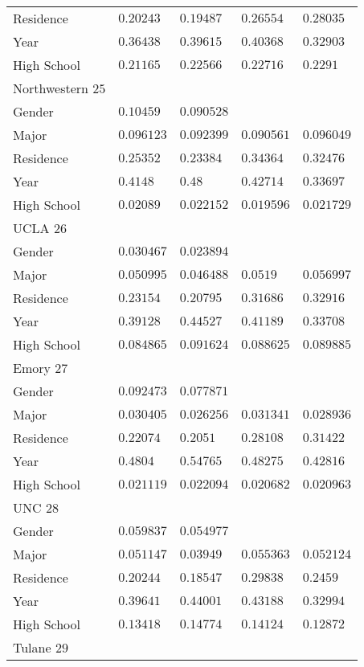 \begin{center}
\begin{longtable}{|l|l|l|l|l|}
Residence & $0.20243$ & $0.19487$ & $0.26554$ & $0.28035$ \\
Year & $0.36438$ & $0.39615$ & $0.40368$ & $0.32903$ \\
High School & $0.21165$ & $0.22566$ & $0.22716$ & $0.2291$ \\ \hline \hline
Northwestern $25$ & & &   \\ \hline
Gender & $0.10459$ & $0.090528$ & & \\
Major & $0.096123$ & $0.092399$ & $0.090561$ & $0.096049$ \\
Residence & $0.25352$ & $0.23384$ & $0.34364$ & $0.32476$ \\
Year & $0.4148$ & $0.48$ & $0.42714$ & $0.33697$ \\
High School & $0.02089$ & $0.022152$ & $0.019596$ & $0.021729$ \\ \hline \hline
UCLA $26$ & & &   \\ \hline
Gender & $0.030467$ & $0.023894$ & & \\
Major & $0.050995$ & $0.046488$ & $0.0519$ & $0.056997$ \\
Residence & $0.23154$ & $0.20795$ & $0.31686$ & $0.32916$ \\
Year & $0.39128$ & $0.44527$ & $0.41189$ & $0.33708$ \\
High School & $0.084865$ & $0.091624$ & $0.088625$ & $0.089885$ \\ \hline \hline
Emory $27$ & & &   \\ \hline
Gender & $0.092473$ & $0.077871$ & & \\
Major & $0.030405$ & $0.026256$ & $0.031341$ & $0.028936$ \\
Residence & $0.22074$ & $0.2051$ & $0.28108$ & $0.31422$ \\
Year & $0.4804$ & $0.54765$ & $0.48275$ & $0.42816$ \\
High School & $0.021119$ & $0.022094$ & $0.020682$ & $0.020963$ \\ \hline \hline
UNC $28$ & & &   \\ \hline
Gender & $0.059837$ & $0.054977$ & & \\
Major & $0.051147$ & $0.03949$ & $0.055363$ & $0.052124$ \\
Residence & $0.20244$ & $0.18547$ & $0.29838$ & $0.2459$ \\
Year & $0.39641$ & $0.44001$ & $0.43188$ & $0.32994$ \\
High School & $0.13418$ & $0.14774$ & $0.14124$ & $0.12872$ \\ \hline \hline
Tulane $29$ & & &   \\ \hline

\end{longtable}
\end{center}
